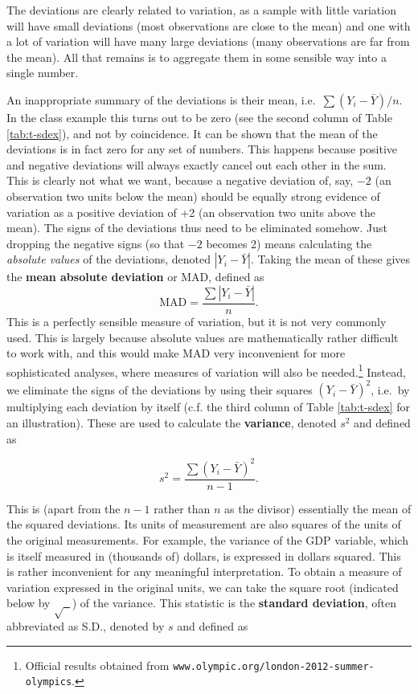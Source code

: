 \documentclass[11pt,a4paper,openany]{book}
\let\rmarkdownfootnote\footnote%
\def\footnote{\protect\rmarkdownfootnote}
\begin{document}
The deviations are clearly related to variation, as a sample with little
variation will have small deviations (most observations are close to the
mean) and one with a lot of variation will have many large deviations
(many observations are far from the mean). All that remains is to
aggregate them in some sensible way into a single number.

An inappropriate summary of the deviations is their mean,
i.e.~\(\sum (Y_{i}-\bar{Y})/n\). In the class example this turns out to
be zero (see the second column of Table \ref{tab:t-sdex}), and not by
coincidence. It can be shown that the mean of the deviations is in fact
zero for any set of numbers. This happens because positive and negative
deviations will always exactly cancel out each other in the sum. This is
clearly not what we want, because a negative deviation of, say, \(-2\)
(an observation two units below the mean) should be equally strong
evidence of variation as a positive deviation of +2 (an observation two
units above the mean). The signs of the deviations thus need to be
eliminated somehow. Just dropping the negative signs (so that \(-2\)
becomes 2) means calculating the \emph{absolute values} of the
deviations, denoted \(|Y_{i}-\bar{Y}|\). Taking the mean of these gives
the \textbf{mean absolute deviation} or MAD, defined as
\[\text{MAD}=\frac{\sum |Y_{i}-\bar{Y}|}{n}.\] This is a perfectly
sensible measure of variation, but it is not very commonly used. This is
largely because absolute values are mathematically rather difficult to
work with, and this would make MAD very inconvenient for more
sophisticated analyses, where measures of variation will also be
needed.\footnote{Official results obtained from
  \texttt{www.olympic.org/london-2012-summer-olympics}.} Instead, we
eliminate the signs of the deviations by using their squares
\((Y_{i}-\bar{Y})^{2}\), i.e.~by multiplying each deviation by itself
(c.f. the third column of Table \ref{tab:t-sdex} for an illustration).
These are used to calculate the \textbf{variance}, denoted \(s^{2}\) and
defined as

\begin{equation}s^{2} = \frac{\sum (Y_{i}-\bar{Y})^{2}}{n-1}.
\label{eq:samplevar}\end{equation}

This is (apart from the \(n-1\) rather than \(n\) as the divisor)
essentially the mean of the squared deviations. Its units of measurement
are also squares of the units of the original measurements. For example,
the variance of the GDP variable, which is itself measured in (thousands
of) dollars, is expressed in dollars squared. This is rather
inconvenient for any meaningful interpretation. To obtain a measure of
variation expressed in the original units, we can take the square root
(indicated below by \(\sqrt{\; \; }\)) of the variance. This statistic
is the \textbf{standard deviation}, often abbreviated as S.D., denoted
by \(s\) and defined as
\end{document}

